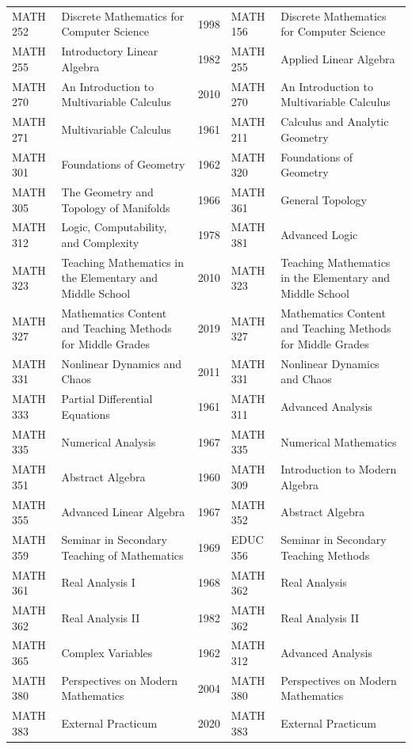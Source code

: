 \documentclass[
]{book}
\begin{document}
\begin{table}
\begin{tabular}[t]{llrll}
MATH 252 & Discrete Mathematics for Computer Science & 1998 & MATH 156 & Discrete Mathematics for Computer Science\\
MATH 255 & Introductory Linear Algebra & 1982 & MATH 255 & Applied Linear Algebra\\
MATH 270 & An Introduction to Multivariable Calculus & 2010 & MATH 270 & An Introduction to Multivariable Calculus\\
MATH 271 & Multivariable Calculus & 1961 & MATH 211 & Calculus and Analytic Geometry\\
\addlinespace
MATH 301 & Foundations of Geometry & 1962 & MATH 320 & Foundations of Geometry\\
MATH 305 & The Geometry and Topology of Manifolds & 1966 & MATH 361 & General Topology\\
MATH 312 & Logic, Computability, and Complexity & 1978 & MATH 381 & Advanced Logic\\
MATH 323 & Teaching Mathematics in the Elementary and Middle School & 2010 & MATH 323 & Teaching Mathematics in the Elementary and Middle School\\
MATH 327 & Mathematics Content and Teaching Methods for Middle Grades & 2019 & MATH 327 & Mathematics Content and Teaching Methods for Middle Grades\\
\addlinespace
MATH 331 & Nonlinear Dynamics and Chaos & 2011 & MATH 331 & Nonlinear Dynamics and Chaos\\
MATH 333 & Partial Differential Equations & 1961 & MATH 311 & Advanced Analysis\\
MATH 335 & Numerical Analysis & 1967 & MATH 335 & Numerical Mathematics\\
MATH 351 & Abstract Algebra & 1960 & MATH 309 & Introduction to Modern Algebra\\
MATH 355 & Advanced Linear Algebra & 1967 & MATH 352 & Abstract Algebra\\
\addlinespace
MATH 359 & Seminar in Secondary Teaching of Mathematics & 1969 & EDUC 356 & Seminar in Secondary Teaching Methods\\
MATH 361 & Real Analysis I & 1968 & MATH 362 & Real Analysis\\
MATH 362 & Real Analysis II & 1982 & MATH 362 & Real Analysis II\\
MATH 365 & Complex Variables & 1962 & MATH 312 & Advanced Analysis\\
MATH 380 & Perspectives on Modern Mathematics & 2004 & MATH 380 & Perspectives on Modern Mathematics\\
\addlinespace
MATH 383 & External Practicum & 2020 & MATH 383 & External Practicum\\

\end{tabular}
\end{table}
\end{document}
